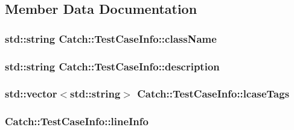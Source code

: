 \subsection{Member Data Documentation}
\hypertarget{struct_catch_1_1_test_case_info_a1a5e0825132a38d091defdebbf2f8ce9}{
\subsubsection[{class\-Name}]{\setlength{\rightskip}{0pt plus 5cm}std\-::string Catch\-::\-Test\-Case\-Info\-::class\-Name}}\label{struct_catch_1_1_test_case_info_a1a5e0825132a38d091defdebbf2f8ce9}
\hypertarget{struct_catch_1_1_test_case_info_a37fe2db9425bc45f6a33893eac31198e}{
\subsubsection[{description}]{\setlength{\rightskip}{0pt plus 5cm}std\-::string Catch\-::\-Test\-Case\-Info\-::description}}\label{struct_catch_1_1_test_case_info_a37fe2db9425bc45f6a33893eac31198e}
\hypertarget{struct_catch_1_1_test_case_info_a844e3de9baf6e53cadfba9733c236bfe}{
\subsubsection[{lcase\-Tags}]{\setlength{\rightskip}{0pt plus 5cm}std\-::vector$<$std\-::string$>$ Catch\-::\-Test\-Case\-Info\-::lcase\-Tags}}\label{struct_catch_1_1_test_case_info_a844e3de9baf6e53cadfba9733c236bfe}
\hypertarget{struct_catch_1_1_test_case_info_aa9407b7f442655b51a2aad24b3fa2fd3}{
\subsubsection[{line\-Info}]{ Catch\-::\-Test\-Case\-Info\-::line\-Info}}\label{struct_catch_1_1_test_case_info_aa9407b7f442655b51a2aad24b3fa2fd3}
